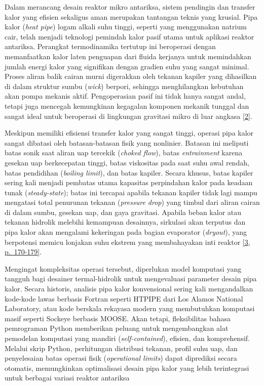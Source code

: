 \documentclass[
]{article}
\begin{document}
Dalam merancang desain reaktor mikro antariksa, sistem pendingin dan
transfer kalor yang efisien sekaligus aman merupakan tantangan teknis
yang krusial. Pipa kalor (\emph{heat pipe}) logam alkali suhu tinggi,
seperti yang menggunakan natrium cair, telah menjadi teknologi pemindah
kalor pasif utama untuk aplikasi reaktor antariksa. Perangkat
termodinamika tertutup ini beroperasi dengan memanfaatkan kalor laten
penguapan dari fluida kerjanya untuk memindahkan jumlah energi kalor
yang signifikan dengan gradien suhu yang sangat minimal. Proses aliran
balik cairan murni digerakkan oleh tekanan kapiler yang dihasilkan di
dalam struktur sumbu (\emph{wick}) berpori, sehingga menghilangkan
kebutuhan akan pompa mekanis aktif. Pengoperasian pasif ini tidak hanya
sangat andal, tetapi juga mencegah kemungkinan kegagalan komponen
mekanik tunggal dan sangat ideal untuk beroperasi di lingkungan
gravitasi mikro di luar angkasa
\href{https://www.zotero.org/google-docs/?0U09MA}{{[}2{]}}.

Meskipun memiliki efisiensi transfer kalor yang sangat tinggi, operasi
pipa kalor sangat dibatasi oleh batasan-batasan fisik yang nonlinier.
Batasan ini meliputi batas sonik saat aliran uap tercekik (\emph{choked
flow}), batas \emph{entrainment} karena gesekan uap berkecepatan tinggi,
batas viskositas pada saat suhu awal rendah, batas pendidihan
(\emph{boiling limit}), dan batas kapiler. Secara khusus, batas kapiler
sering kali menjadi pembatas utama kapasitas perpindahan kalor pada
keadaan tunak (\emph{steady-state}); batas ini tercapai apabila tekanan
kapiler tidak lagi mampu mengatasi total penurunan tekanan
(\emph{pressure drop}) yang timbul dari aliran cairan di dalam sumbu,
gesekan uap, dan gaya gravitasi. Apabila beban kalor atau tekanan
hidrolik melebihi kemampuan desainnya, sirkulasi akan terputus dan pipa
kalor akan mengalami kekeringan pada bagian evaporator (\emph{dryout}),
yang berpotensi memicu lonjakan suhu ekstrem yang membahayakan inti
reaktor \href{https://www.zotero.org/google-docs/?QjHnZM}{{[}3,
p.~170-179{]}}.

Mengingat kompleksitas operasi tersebut, diperlukan model komputasi yang
tangguh bagi desainer termal-hidrolik untuk mengevaluasi parameter
desain pipa kalor. Secara historis, analisis pipa kalor konvensional
sering kali mengandalkan kode-kode lawas berbasis Fortran seperti HTPIPE
dari Los Alamos National Laboratory, atau kode berskala rekayasa modern
yang membutuhkan komputasi masif seperti Sockeye berbasis MOOSE. Akan
tetapi, fleksibilitas bahasa pemrograman Python memberikan peluang untuk
mengembangkan alat pemodelan komputasi yang mandiri
(\emph{self-contained}), efisien, dan komprehensif. Melalui skrip
Python, perhitungan distribusi tekanan, profil suhu uap, dan
penyelesaian batas operasi fisik (\emph{operational limits}) dapat
diprediksi secara otomatis, memungkinkan optimalisasi desain pipa kalor
yang lebih terintegrasi untuk berbagai variasi reaktor antariksa
\end{document}
